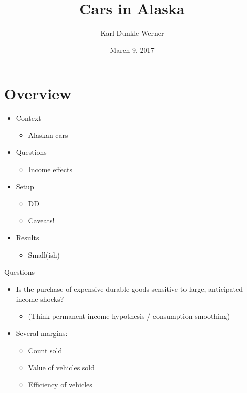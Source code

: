 \documentclass[aspectratio=169]{beamer}
\title[Cars in Alaska]{Cars in Alaska}
\author{Karl Dunkle Werner}
\institute{}
\date{March 9, 2017}
\begin{document}
\begin{frame}
	\maketitle
\end{frame}
\section{Overview}


\begin{frame}
	\begin{itemize}
		\item Context
		\begin{itemize}
			\item Alaskan cars
		\end{itemize}
		\item Questions
		\begin{itemize}
			\item Income effects
		\end{itemize}
		\item Setup
		\begin{itemize}
			\item DD
			\item Caveats!
		\end{itemize}
		\item Results
		\begin{itemize}
			\item Small(ish)
		\end{itemize}
	\end{itemize}
\end{frame}
{
\begin{frame}[plain]
\end{frame}
}

\begin{frame}{Questions}
	\begin{itemize}
		\item Is the purchase of expensive durable goods sensitive to large, anticipated income shocks?
			\begin{itemize}
				\item (Think permanent income hypothesis / consumption smoothing)
			\end{itemize}
		\item Several margins:
		\begin{itemize}
			\item Count sold
			\item Value of vehicles sold
			\item Efficiency of vehicles
		\end{itemize}
	\end{itemize}
\end{frame}
\end{document}
